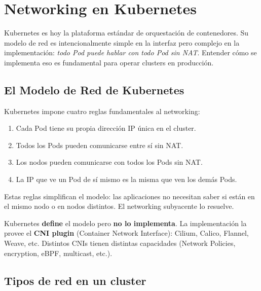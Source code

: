 
\chapter{ Networking en Kubernetes}

Kubernetes es hoy la plataforma estándar de orquestación de contenedores. Su modelo
de red es intencionalmente simple en la interfaz pero complejo en la implementación:
\emph{todo Pod puede hablar con todo Pod sin NAT}. Entender cómo se implementa eso
es fundamental para operar clusters en producción.

\section{ El Modelo de Red de Kubernetes}

\begin{concepto}
Kubernetes impone cuatro reglas fundamentales al networking:

\begin{enumerate}
    \item Cada Pod tiene su propia dirección IP única en el cluster.
    \item Todos los Pods pueden comunicarse entre sí sin NAT.
    \item Los nodos pueden comunicarse con todos los Pods sin NAT.
    \item La IP que ve un Pod de sí mismo es la misma que ven los demás Pods.
\end{enumerate}

Estas reglas simplifican el modelo: las aplicaciones no necesitan saber si están en el
mismo nodo o en nodos distintos. El networking subyacente lo resuelve.
\end{concepto}

\begin{cuidado}
Kubernetes \textbf{define} el modelo pero \textbf{no lo implementa}. La implementación
la provee el \textbf{CNI plugin} (Container Network Interface): Cilium, Calico, Flannel,
Weave, etc. Distintos CNIs tienen distintas capacidades (Network Policies, encryption,
eBPF, multicast, etc.).
\end{cuidado}

\section{ Tipos de red en un cluster}

